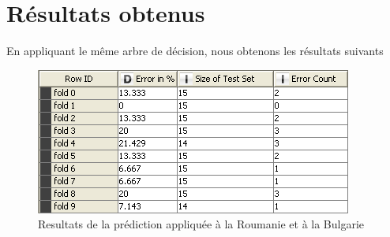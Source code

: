 \section{Résultats obtenus}
En appliquant le même arbre de décision, nous obtenons les résultats suivants
\begin{figure}[H]
	\begin{center}
		\includegraphics[scale=0.5]{Image/ErrorRatesSante}
		\caption{Resultats de la prédiction appliquée à la Roumanie et à la Bulgarie}
	\end{center}
\end{figure}